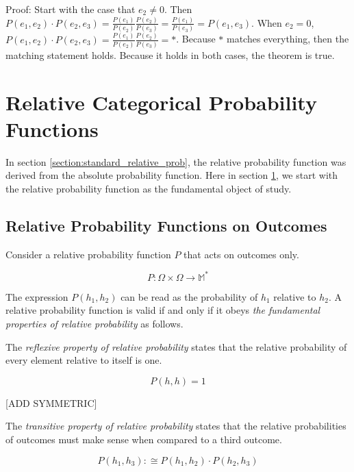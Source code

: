 \documentclass[twoside]{article}
\begin{document}
Proof: Start with the case that \(e_2 \neq 0\). Then \(P(e_1, e_2) \cdot P(e_2, e_3) = \frac{P(e_1)}{P(e_2)}\frac{P(e_2)}{P(e_3)} = \frac{P(e_1)}{P(e_3)} = P(e_1, e_3)\). When \(e_2 = 0\), \(P(e_1, e_2) \cdot P(e_2, e_3) = \frac{P(e_1)}{P(e_2)}\frac{P(e_2)}{P(e_3)} = \ast\). Because \(\ast\) matches everything, then the matching statement holds. Because it holds in both cases, the theorem is true.

\section{Relative Categorical Probability Functions}
\label{section:new_relative_prob}

In section \ref{section:standard_relative_prob}, the relative probability function was derived from the absolute probability function. Here in section \ref{section:new_relative_prob}, we start with the relative probability function as the fundamental object of study.

\subsection{Relative Probability Functions on Outcomes}

Consider a relative probability function \(P\) that acts on outcomes only.

\[P: \Omega \times \Omega \rightarrow \mathbb{M}^*\]

The expression \(P(h_1, h_2)\) can be read as the probability of \(h_1\) relative to \(h_2\). A relative probability function is valid if and only if it obeys \textit{the fundamental properties of relative probability} as follows.

The \textit{reflexive property of relative probability} states that the relative probability of every element relative to itself is one.

\begin{equation}
\label{eq:fundamental_prop_reflexive}
P(h, h) = 1
\end{equation}

[ADD SYMMETRIC]

The \textit{transitive property of relative probability} states that the relative probabilities of outcomes must make sense when compared to a third outcome. 

\begin{equation}
\label{eq:fundamental_prop_transitive}
P(h_1, h_3) :\cong P(h_1, h_2) \cdot P(h_2, h_3)
\end{equation}
\end{document}
